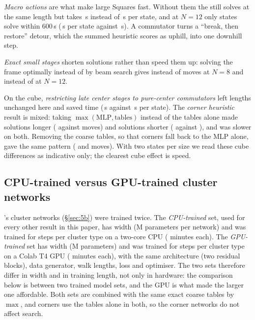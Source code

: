 \emph{Macro actions} are what make large Squares fast. Without them the  still solves at the
same length but takes \AblSquareNoMacrosNiTime\,s instead of \AblSquareFullNiTime\,s per state,
and at $N=12$ only \AblSquareNoMacrosNmSolved{} states solve within 600\,s
(\AblSquareNoMacrosNmTime\,s per state against \AblSquareFullNmTime\,s). A commutator turns a
``break, then restore'' detour, which the summed heuristic scores as uphill, into one downhill step.

\emph{Exact small stages} shorten solutions rather than speed them up: solving the frame optimally
instead of by beam search gives \AblSquareFullNiHTM{} instead of \AblSquareNoExactStagesNiHTM{} moves
at $N=8$ and \AblSquareFullNmHTM{} instead of \AblSquareNoExactStagesNmHTM{} at $N=12$.

On the cube, \emph{restricting late center stages to pure-center commutators} left lengths unchanged
here and saved time (\AblCubeFullNfTime\,s against \AblCubeNoCenterMacroRestrictionNfTime\,s per
 state). The \emph{corner heuristic} result is mixed: taking $\max(\text{MLP},\text{tables})$
instead of the tables alone made  solutions longer (\AblCubeCornerMlpPlusTablesNeHTM{}
against \AblCubeFullNeHTM{} moves) and  solutions shorter (\AblCubeCornerMlpPlusTablesNfHTM{}
against \AblCubeFullNfHTM{}), and was slower on both. Removing the coarse tables, so that corners fall back to the MLP alone,
gave the same pattern (\AblCubeNoCoarseTablesNeHTM{} and \AblCubeNoCoarseTablesNfHTM{} moves). With
two states per size we read these cube differences as indicative only; the clearest cube effect is
speed.

\subsection{CPU-trained versus GPU-trained cluster networks}
\label{sec:cpugpu}

\FiveB's cluster networks (\S\ref{sec:5b}) were trained twice. The \emph{CPU-trained} set, used for
every other \FiveB result in this paper, has width \CpuHidden{} (\CpuParams{}M parameters per network) and
was trained for \CpuSteps{} steps per cluster type on a two-core CPU (\CpuTrainMin{} minutes each). The
\emph{GPU-trained} set has width \GpuHidden{} (\GpuParams{}M parameters) and was trained for \GpuSteps{}
steps per cluster type on a Colab T4 GPU (\GpuTrainMin{} minutes each), with the same architecture
(two residual blocks), data generator, walk lengths, loss and optimiser. The two sets therefore differ in
width and in training length, not only in hardware: the comparison below is between two trained model sets,
and the GPU is what made the larger one affordable. Both sets are combined with the same exact coarse
tables by $\max$, and corners use the tables alone in both, so the corner networks do not affect search.

